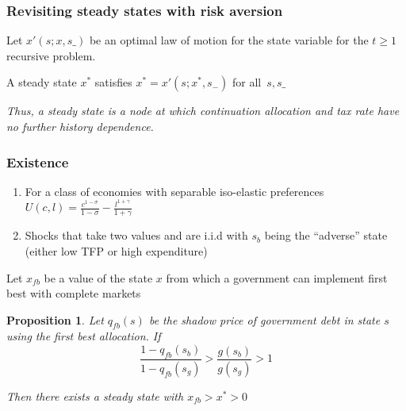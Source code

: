 \documentclass{beamer}
\newtheorem{proposition}{Proposition}
\begin{document}
\begin{frame}
 \frametitle{Revisiting steady states with risk aversion}
Let $x'\left( s;{x},s\_\right) $ be an optimal  law of motion for the state variable
for the $t\geq1$ recursive problem.

\begin{definition}
 A steady state  ${x}^{*} $  satisfies ${ x}^{*}  =x' \left( s;{x}^{*},s_{-}\right) $ for all $%
\,s,s\_$
\end{definition}


\vspace{3mm}
\emph{Thus, a steady state is a node at which  continuation allocation and tax rate have no further history dependence. }

 \end{frame}




 \begin{frame}
	\frametitle{Existence}
	
	\begin{enumerate}
	 \item For a class of economies with separable iso-elastic preferences
	 $U(c,l) = \frac{c^{1-\sigma}}{1-\sigma} -\frac{ l^{1+\gamma}}{1+\gamma}$
	 \item Shocks that take two values and are i.i.d with $s_b$  being the ``adverse'' state (either low TFP or high expenditure)
	\end{enumerate}

	
	Let $x_{fb}$ be a value of the state $x$ from which a government can implement first best with complete markets
	
	
	
	
	\begin{proposition}  Let $q_{fb}(s)$ be the shadow price of government debt in state $s$ using the first best allocation.
	If
	\[
		\frac{1-q_{fb}(s_b)}{1-q_{fb}(s_g)} > \frac{g(s_b)}{g(s_g)}>1
	\]
	
	Then there exists a steady state with $x_{fb}>x^*>0$
		\end{proposition}
\end{frame}


%
\end{document}
